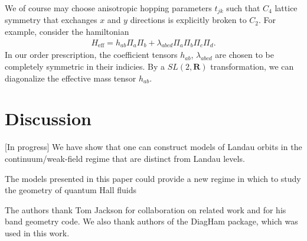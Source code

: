 \documentclass[aps,prb,twocolumn,letterpaper,twoside,nobalancelastpage,groupedaddress,amsmath,amssymb,floatfix,citeautoscript]{revtex4-1}
\begin{document}
We of course may choose anisotropic hopping parameters $t_{jk}$ such that $C_4$ lattice symmetry that exchanges $x$ and $y$ directions is explicitly broken to $C_2$. For example, consider the hamiltonian
\begin{align*}
H_{\text{eff}} = h_{ab}\Pi_a \Pi_b + \lambda_{abcd} \Pi_a \Pi_b \Pi_c \Pi_d.
\end{align*}
In our order prescription, the coefficient tensors $h_{ab}$, $\lambda_{abcd}$ are chosen to be completely symmetric in their indicies.
By a $SL(2,\mathbf{R})$ transformation, we can diagonalize the effective mass tensor $h_{ab}$.


\section{Discussion}
[In progress]
We have show that one can construct models of Landau orbits in the continuum/weak-field regime that are distinct from Landau levels.

The models presented in this paper could provide a new regime in which to study the geometry of quantum Hall fluids 

\begin{acknowledgments}
The authors thank Tom Jackson for collaboration on related work and for his band geometry code. We also thank authors of the DiagHam package, which was used in this work.

\end{acknowledgments}


\end{document}
